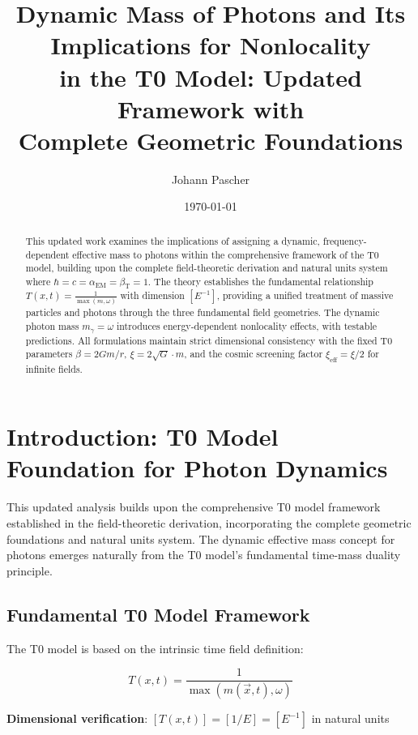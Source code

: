 \documentclass[12pt,a4paper]{article}
\title{Dynamic Mass of Photons and Its Implications for Nonlocality \\ in the T0 Model: Updated Framework with \\ Complete Geometric Foundations}
\author{Johann Pascher}
\date{\today}
\newcommand{\Tfield}{T(x,t)}
\begin{document}
	
	\maketitle
	
	\begin{abstract}
		This updated work examines the implications of assigning a dynamic, frequency-dependent effective mass to photons within the comprehensive framework of the T0 model, building upon the complete field-theoretic derivation and natural units system where $\hbar = c = \alpha_{\text{EM}} = \beta_{\text{T}} = 1$. The theory establishes the fundamental relationship $\Tfield = \frac{1}{\max(m, \omega)}$ with dimension $[E^{-1}]$, providing a unified treatment of massive particles and photons through the three fundamental field geometries. The dynamic photon mass $m_\gamma = \omega$ introduces energy-dependent nonlocality effects, with testable predictions. All formulations maintain strict dimensional consistency with the fixed T0 parameters $\beta = 2Gm/r$, $\xi = 2\sqrt{G} \cdot m$, and the cosmic screening factor $\xi_{\text{eff}} = \xi/2$ for infinite fields.
	\end{abstract}
	
	\tableofcontents
	\newpage
	
	\section{Introduction: T0 Model Foundation for Photon Dynamics}
	
	This updated analysis builds upon the comprehensive T0 model framework established in the field-theoretic derivation, incorporating the complete geometric foundations and natural units system. The dynamic effective mass concept for photons emerges naturally from the T0 model's fundamental time-mass duality principle.
	
	\subsection{Fundamental T0 Model Framework}
	
	The T0 model is based on the intrinsic time field definition:
	
	\begin{equation}
		\boxed{\Tfield = \frac{1}{\max(m(\vec{x},t), \omega)}}
		\label{eq:intrinsic_time_field}
	\end{equation}
	
	\textbf{Dimensional verification}: $[\Tfield] = [1/E] = [E^{-1}]$ in natural units \checkmark
	
\end{document}
